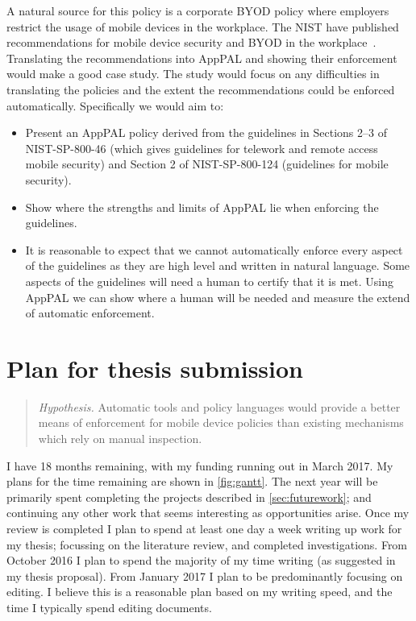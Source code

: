 \documentclass[a4paper]{scrartcl}
\begin{document}
A natural source for this policy is a corporate \ac{BYOD} policy where employers restrict the usage of mobile devices in the workplace.
The \ac{NIST} have published recommendations for mobile device security and \ac{BYOD} in the workplace~\citep{Souppaya:2013jf,Scarfone:2009vy}.
Translating the recommendations into AppPAL and showing their enforcement would make a good case study.
The study would focus on any difficulties in translating the policies and the extent the recommendations could be enforced automatically.
Specifically we would aim to:
\begin{itemize}
  \item
    Present an AppPAL policy derived from the guidelines in Sections 2--3 of NIST-SP-800-46 (which gives guidelines for telework and remote access mobile security) and Section 2 of NIST-SP-800-124 (guidelines for mobile security).
  \item
    Show where the strengths and limits of AppPAL lie when enforcing the guidelines.
  \item
    It is reasonable to expect that we cannot automatically enforce every aspect of the guidelines as they are high level and written in natural language.
    Some aspects of the guidelines will need a human to certify that it is met.
    Using AppPAL we can show where a human will be needed and measure the extend of automatic enforcement.
\end{itemize}

\section{Plan for thesis submission}

\begin{quote}
  \emph{Hypothesis.} Automatic tools and policy languages would provide a
  better means of enforcement for mobile device policies than existing
  mechanisms which rely on manual inspection.
\end{quote}

I have 18 months remaining, with my funding running out in March 2017.
My plans for the time remaining are shown in \autoref{fig:gantt}.
The next year will be primarily spent completing the projects described in \autoref{sec:futurework}; and continuing any other work that seems interesting as opportunities arise.
Once my review is completed I plan to spend at least one day a week writing up work for my thesis; focussing on the literature review, and completed investigations.
From October 2016 I plan to spend the majority of my time writing (as suggested in my thesis proposal).
From January 2017 I plan to be predominantly focusing on editing.
I believe this is a reasonable plan based on my writing speed, and the time I typically spend editing documents.
\end{document}
